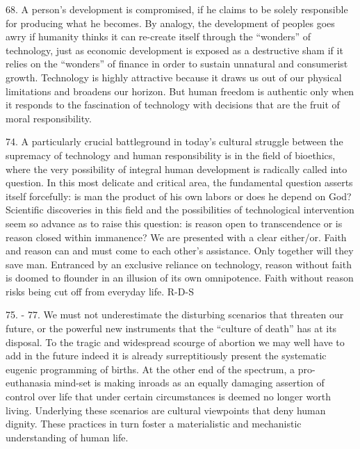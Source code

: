 \documentclass[oneside]{book}
\begin{document}
68. A person's development is compromised, if he claims to be solely responsible
for producing what he becomes. By analogy, the development of peoples goes awry
if humanity thinks it can re-create itself through the ``wonders'' of
technology, just as economic development is exposed as a destructive sham if it
relies on the ``wonders'' of finance in order to sustain unnatural and
consumerist growth. Technology is highly attractive because it draws us out of
our physical limitations and broadens our horizon. But human freedom is
authentic only when it responds to the fascination of technology with decisions
that are the fruit of moral responsibility.

74. A particularly crucial battleground in today's cultural struggle between the
supremacy of technology and human responsibility is in the field of bioethics,
where the very possibility of integral human development is radically called
into question. In this most delicate and critical area, the fundamental question
asserts itself forcefully: is man the product of his own labors or does he
depend on God? Scientific discoveries in this field and the possibilities of
technological intervention seem so advance as to raise this question: is reason
open to transcendence or is reason closed within immanence? We are presented
with a clear either/or. Faith and reason can and must come to each other's
assistance. Only together will they save man. Entranced by an exclusive reliance
on technology, reason without faith is doomed to flounder in an illusion of its
own omnipotence. Faith without reason risks being cut off from everyday life.
R-D-S

75. - 77. We must not underestimate the disturbing scenarios that threaten our
future, or the powerful new instruments that the ``culture of death'' has at its
disposal. To the tragic and widespread scourge of abortion we may well have to
add in the future  indeed it is already surreptitiously present  the systematic
eugenic programming of births. At the other end of the spectrum, a
pro-euthanasia mind-set is making inroads as an equally damaging assertion of
control over life that under certain circumstances is deemed no longer worth
living. Underlying these scenarios are cultural viewpoints that deny human
dignity. These practices in turn foster a materialistic and mechanistic
understanding of human life.
\end{document}

